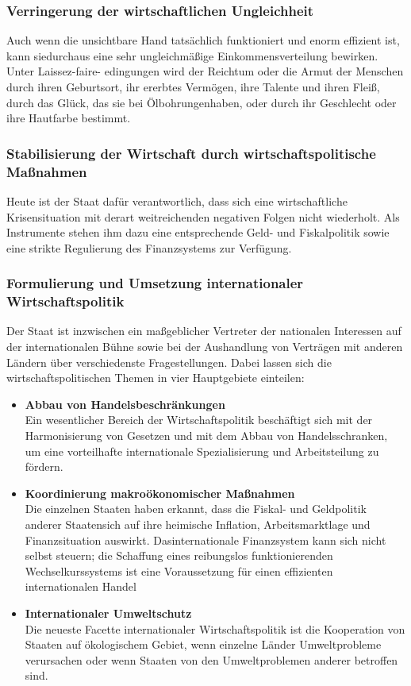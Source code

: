 \documentclass[10pt]{scrartcl}
\begin{document}
\subsubsection{Verringerung der wirtschaftlichen Ungleichheit}
Auch wenn die unsichtbare Hand tatsächlich funktioniert und enorm effizient ist, kann siedurchaus eine sehr ungleichmäßige Einkommensverteilung bewirken. Unter Laissez-faire- edingungen wird der Reichtum oder die Armut der Menschen durch ihren Geburtsort, ihr ererbtes Vermögen, ihre Talente und ihren Fleiß, durch das Glück, das sie bei Ölbohrungenhaben, oder durch ihr Geschlecht oder ihre Hautfarbe bestimmt.  

\subsubsection{Stabilisierung der Wirtschaft durch wirtschaftspolitische Maßnahmen}
Heute ist der Staat dafür verantwortlich, dass sich eine wirtschaftliche Krisensituation mit derart weitreichenden negativen Folgen nicht wiederholt. Als Instrumente stehen ihm dazu eine entsprechende Geld- und Fiskalpolitik sowie eine strikte Regulierung des Finanzsystems zur Verfügung.

\subsubsection{Formulierung und Umsetzung internationaler Wirtschaftspolitik}
Der Staat ist inzwischen ein maßgeblicher Vertreter der nationalen Interessen auf der internationalen Bühne sowie bei der Aushandlung von Verträgen mit anderen Ländern über verschiedenste Fragestellungen. Dabei lassen sich die wirtschaftspolitischen Themen in vier Hauptgebiete einteilen:
\begin{itemize}
\item {\bf Abbau von Handelsbeschränkungen}\\
Ein wesentlicher Bereich der Wirtschaftspolitik beschäftigt sich mit der Harmonisierung von Gesetzen und mit dem Abbau von Handelsschranken, um eine vorteilhafte internationale Spezialisierung und Arbeitsteilung zu fördern. 
\item {\bf Koordinierung makroökonomischer Maßnahmen} \\
Die einzelnen Staaten haben erkannt, dass die Fiskal- und Geldpolitik anderer Staatensich  auf ihre heimische Inflation, Arbeitsmarktlage und Finanzsituation auswirkt. Dasinternationale Finanzsystem kann sich nicht selbst steuern; die Schaffung eines reibungslos funktionierenden Wechselkurssystems ist eine Voraussetzung für einen effizienten internationalen Handel 
\item {\bf Internationaler Umweltschutz}\\
Die neueste Facette internationaler Wirtschaftspolitik ist die Kooperation von Staaten auf ökologischem Gebiet, wenn einzelne Länder Umweltprobleme verursachen oder wenn Staaten von den Umweltproblemen anderer betroffen sind.  
\end{itemize}
\end{document}

